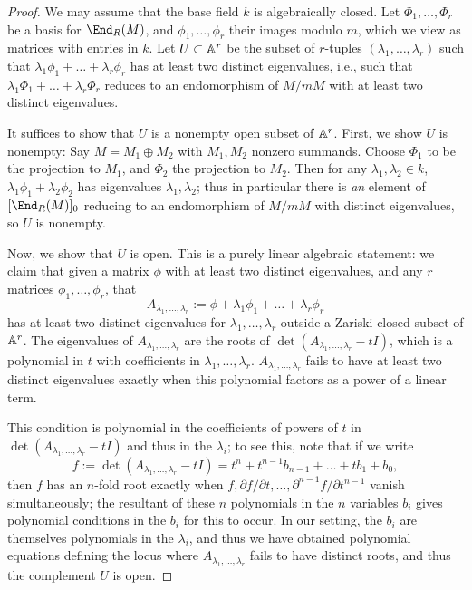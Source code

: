 \documentclass[12pt]{article}
\let\l\lambda
\numberwithin{equation}{section}
\let\d\partial
\theoremstyle{theorem}
\numberwithin{thm}{section}
\theoremstyle{definition}
\begin{document}
\begin{proof}
  We may assume that the base field $k$ is algebraically closed.
  Let $\Phi_1,\dots,\Phi_r$ be a basis for $\End_R(M)$, and $\phi_1,\dots,\phi_r$ their images modulo $m$, which we view as matrices with entries in $k$.
  Let $U\subset \mathbb A^r$ be the subset of $r$-tuples $(\l_1,\dots,\l_r)$ such that $\l_1\phi_1+\dots+\l_r\phi_r$ has at least two distinct eigenvalues, i.e., such that $\l_1\Phi_1+\dots+\l_r\Phi_r$ reduces to an endomorphism of $M/mM$ with at least two distinct eigenvalues.

  It suffices to show that $U$ is a nonempty open subset of $\mathbb A^r$. First, we show $U$ is nonempty:
  Say $M=M_1\oplus M_2$ with $M_1,M_2$  nonzero  summands. Choose $\Phi_1$ to be the projection to $M_1$, and $\Phi_2$ the projection to $M_2$. Then for any $\l_1,\l_2\in k$, $\l_1\phi_1 + \l_2\phi_2$ has eigenvalues $\l_1,\l_2$; thus in particular there is \emph{an} element of $[\End_R(M)]_0$ reducing to an endomorphism of $M/mM$ with distinct eigenvalues, so $U$ is nonempty.

  Now, we show that $U$ is open. This is a purely linear algebraic statement: we claim that given a matrix $\phi$ with at least two distinct eigenvalues, and any $r$ matrices $\phi_1,\dots,\phi_r$, that
  $$ A_{\l_1,\dots,\l_r}:=\phi+\l_1\phi_1+\dots+\l_r\phi_r $$
  has at least two distinct eigenvalues for $\l_1,\dots,\l_r$ outside a Zariski-closed subset of $\mathbb A^r$.
  The eigenvalues of $A_{\l_1,\dots,\l_r}$ are the roots of $\det(A_{\l_1,\dots,\l_r}-t I)$, which is a polynomial in $t$ with coefficients in $\l_1,\dots,\l_r$.
$A_{\l_1,\dots,\l_r}$ fails to have at least two distinct eigenvalues exactly when this polynomial factors as a power of a linear term.

This condition is polynomial in the coefficients of powers of $t$ in $\det(A_{\l_1,\dots,\l_r}-t I)$ and thus in the $\l_i$; to see this, note that
if we write
  $$ f:=\det(A_{\l_1,\dots,\l_r}-t I)=t^n  +t^{n-1}b_{n-1}+\dots +t b_1 +b_0, $$
then $f$
  has an $n$-fold root exactly when
  $ f,\d f/\d t,\dots, \d^{n-1} f/\d t^{n-1} $
  vanish simultaneously; the resultant of these $n$ polynomials in the $n$ variables $b_i$ gives polynomial conditions in the $b_i$ for this to occur.
 In our setting, the $b_i$ are themselves polynomials in the $\l_i$, and thus we have obtained polynomial equations defining the locus where $A_{\l_1,\dots,\l_r}$ fails to have distinct roots, and thus the complement $U$ is open.
\end{proof}
\end{document}
